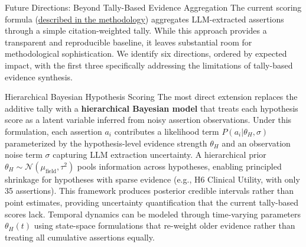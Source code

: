 \documentclass[
  ignorenonframetext,
]{beamer}
\begin{document}
\begin{frame}[fragile]{Future Directions: Beyond Tally-Based Evidence
Aggregation}
\protect{}\label{future-directions-beyond-tally-based-evidence-aggregation}
The current scoring formula
(\hyperref[sec:methods_kg]{described in the methodology}) aggregates
LLM-extracted assertions through a simple citation-weighted tally. While
this approach provides a transparent and reproducible baseline, it
leaves substantial room for methodological sophistication. We identify
six directions, ordered by expected impact, with the first three
specifically addressing the limitations of tally-based evidence
synthesis.

\begin{block}{Hierarchical Bayesian Hypothesis Scoring}
\protect{}\label{hierarchical-bayesian-hypothesis-scoring}
The most direct extension replaces the additive tally with a
\textbf{hierarchical Bayesian model} that treats each hypothesis score
as a latent variable inferred from noisy assertion observations. Under
this formulation, each assertion \(a_i\) contributes a likelihood term
\(P(a_i | \theta_H, \sigma)\) parameterized by the hypothesis-level
evidence strength \(\theta_H\) and an observation noise term \(\sigma\)
capturing LLM extraction uncertainty. A hierarchical prior
\(\theta_H \sim \mathcal{N}(\mu_{\text{field}}, \tau^2)\) pools
information across hypotheses, enabling principled shrinkage for
hypotheses with sparse evidence (e.g., H6 Clinical Utility, with only 35
assertions). This framework produces posterior credible intervals rather
than point estimates, providing uncertainty quantification that the
current tally-based scores lack. Temporal dynamics can be modeled
through time-varying parameters \(\theta_H(t)\) using state-space
formulations that re-weight older evidence rather than treating all
cumulative assertions equally.
\end{block}


\end{frame}
\end{document}
